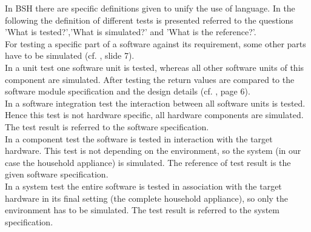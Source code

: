 In BSH there are specific definitions given to unify the use of language. In the following the definition of different tests is presented referred to the questions 'What is tested?','What is simulated?' and 'What is the reference?'.
\\
For testing a specific part of a software against its requirement, some other parts have to be simulated (cf. \cite{BSH14}, slide 7). 
\\
In a unit test one software unit is tested, whereas all other software units of this component are simulated. After testing the return values are compared to the software module specification and the design details (cf. \cite{Grue13}, page 6).
\\
In a software integration test the interaction between all software units is tested. Hence this test is not hardware specific, all hardware components are simulated. The test result is referred to the software specification.
\\
In a component test the software is tested in interaction with the target hardware. This test is not depending on the environment, so the system (in our case the household appliance) is simulated. The reference of test result is the given software specification.
\\
In a system test the entire software is tested in association with the target hardware in its final setting (the complete household appliance), so only the environment has to be simulated. The test result is referred to the system specification.








